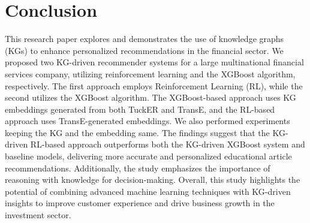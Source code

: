 \documentclass[11pt]{article}
\begin{document}
\section{Conclusion} \label{sec_conclusion}
This research paper explores and demonstrates the use of knowledge graphs (KGs) to enhance personalized recommendations in the financial sector. We proposed two KG-driven recommender systems for a large multinational financial services company, utilizing reinforcement learning and the XGBoost algorithm, respectively. The first approach employs Reinforcement Learning (RL), while the second utilizes the XGBoost algorithm. The XGBoost-based approach uses KG embeddings generated from both TuckER and TransE, and the RL-based approach uses TransE-generated embeddings. We also performed experiments keeping the KG and the embedding same. The findings suggest that the KG-driven RL-based approach outperforms both the KG-driven XGBoost system and baseline models, delivering more accurate and personalized educational article recommendations. Additionally, the study emphasizes the importance of reasoning with knowledge for decision-making. Overall, this study highlights the potential of combining advanced machine learning techniques with KG-driven insights to improve customer experience and drive business growth in the investment sector.






\end{document}
